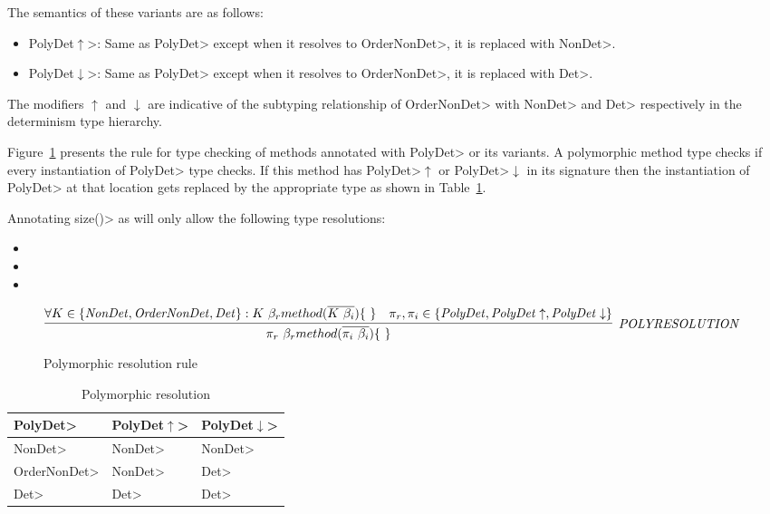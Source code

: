 The semantics of these variants are as follows:
\begin{itemize}
    \item \<PolyDet$\uparrow$>: Same as \<PolyDet> except when it resolves to \<OrderNonDet>, it is replaced with \<NonDet>.
    \item \<PolyDet$\downarrow$>: Same as \<PolyDet> except when it resolves to \<OrderNonDet>, it is replaced with \<Det>.
\end{itemize} 
The modifiers $\uparrow$ and $\downarrow$ are indicative of the subtyping relationship of \<OrderNonDet> with \<NonDet> and \<Det> respectively
in the determinism type hierarchy.

Figure~\ref{fig-poly-resolution} presents the rule for type checking of methods annotated with \<PolyDet> or its variants.
A polymorphic method type checks if every instantiation of \<PolyDet> type checks. If this method has \<PolyDet>$\uparrow$ or \<PolyDet>$\downarrow$
in its signature then the instantiation of \<PolyDet> at that location gets replaced by the appropriate type as shown in Table~\ref{tab-poly-resolutions}.

Annotating \<size()> as  will only allow the following type resolutions:
\begin{itemize}
    \item {}
    \item {}
    \item {}
\end{itemize}

\begin{figure}
    $\infer[\sc{\mathit{POLY RESOLUTION}}]{\pi_r \ \beta_r method(\overline{\pi_i \ \beta_i})\{\ \}}{\forall K \in \{\mathit{NonDet, OrderNonDet, Det\}} : K \ \beta_r method(\overline{K \ \beta_i})\{\ \} & \pi_r, \pi_i \in \{\mathit{PolyDet}, \mathit{PolyDet}\uparrow, \mathit{PolyDet}\downarrow    \}}$
    \caption{Polymorphic resolution rule}
    \label{fig-poly-resolution}
\end{figure}

\begin{table}[]
    \begin{tabular}{|l|l|l|}
        \hline
        \textbf{\<PolyDet>} & \textbf{\<PolyDet$\uparrow$>} & \textbf{\<PolyDet$\downarrow$>} \\ \hline
        \<NonDet> & \<NonDet> &  \<NonDet>\\ \hline
        \<OrderNonDet> & \<NonDet> &  \<Det>\\ \hline
        \<Det> & \<Det> &  \<Det>\\ \hline
    \end{tabular}
\caption{Polymorphic resolution}
\label{tab-poly-resolutions}
\end{table}


